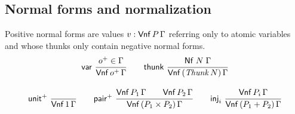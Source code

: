 \documentclass[a4paper,USenglish,cleveref, autoref]{lipics-v2019}
\begin{document}
\subsection{Normal forms and normalization}

Positive normal forms are values $v : \mathsf{Vnf}\,P\,\Gamma$
referring only to atomic variables and
whose thunks only
contain negative normal forms.
\begin{gather*}
  \nru{\tvar}{\patom \in \Gamma}{\PValNf {\patom} \Gamma}
\qquad
  \nru{\tthunk}{\Nf N \Gamma}{\PValNfP{\Thunk N}\Gamma}
\\[2ex]
  \nru{\punit}{}{\PValNf{\tyone}\Gamma}
\qquad
  \nru{\ppair}
      {\PValNf{P_1}\Gamma \qquad \PValNf{P_2}\Gamma}
      {\PValNfP{P_1 \times P_2}\Gamma}
\qquad
  \nru{\tinj_i}{\PValNf{P_i}\Gamma}{\PValNfP{P_1 + P_2}\Gamma}
\end{gather*}
\end{document}
